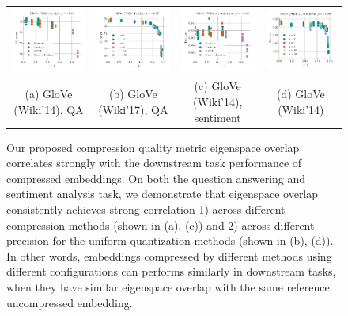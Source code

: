 \begin{figure}
	\footnotesize
	\begin{tabular}{@{\hskip -0.0in}c@{\hskip -0.0in}c@{\hskip -0.0in}c@{\hskip -0.0in}c@{\hskip -0.0in}}
		\includegraphics[width=.245\linewidth]{figures/glove400k_qa_best-f1_vs_subspace-eig-overlap_linx.pdf} &
		\includegraphics[width=.245\linewidth]{figures/glove-wiki400k-am_qa_best-f1_vs_subspace-eig-overlap_linx.pdf} &
		\includegraphics[width=.245\linewidth]{figures/glove400k_sentiment_trec_test-acc_vs_subspace-eig-overlap_linx.pdf} &
		\includegraphics[width=.245\linewidth]{figures/glove-wiki400k-am_sentiment_trec_test-acc_vs_subspace-eig-overlap_linx.pdf}	\\
		(a) GloVe (Wiki'14), QA & \;\;\;\;(b) GloVe (Wiki'17), QA  & \;\;\;\;\;\;(c) GloVe (Wiki'14), sentiment & \;\;\;\;\;(d) GloVe (Wiki'14)
	\end{tabular}
	\caption{Our proposed compression quality metric eigenspace overlap correlates strongly with the downstream task performance of compressed embeddings.  On both the question answering and sentiment analysis task, we demonstrate that eigenspace overlap consistently achieves strong correlation 1) across different compression methods (shown in (a), (c)) and 2) across different precision for the uniform quantization methods (shown in (b), (d)). In other words, embeddings compressed by different methods using different configurations can performs similarly in downstream tasks, when they have similar eigenspace overlap with the same reference uncompressed embedding.}
	\label{fig:good_correlation}
\end{figure}

